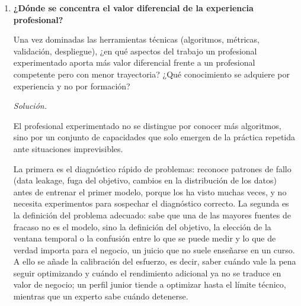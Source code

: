 \documentclass[12pt]{article}
\newcommand\sol[1]{\begin{mdframed}
\emph{Solución.} #1
\end{mdframed}}
\begin{document}
\begin{enumerate}
{\medskip
Las horas dieciocho a veintidós se reservan para la calibración y la evaluación final: calibrar las
probabilidades si se requiere precisión probabilística; evaluar en el conjunto de test con métricas
alineadas al problema (AUC-ROC, AUC-PR, F1 en el umbral operativo); y verificar la consistencia entre
particiones. Las dos últimas horas se dedican a documentar las decisiones, los resultados y las
limitaciones.

\medskip
Las decisiones clave se justifican por la restricción temporal y operativa: el orden secuencial
(variables antes que hiperparámetros) evita rehacer trabajo; programar la búsqueda bayesiana de forma
desatendida optimiza el ciclo de 24 horas reales; y la validación estratificada en 5 particiones
aporta la robustez necesaria para un dataset de 50.000 observaciones frente a un simple \textit{hold-out}.
}

\item \textbf{¿Dónde se concentra el valor diferencial de la experiencia profesional?}

Una vez dominadas las herramientas técnicas (algoritmos, métricas, validación, despliegue),
¿en qué aspectos del trabajo un profesional experimentado aporta más valor diferencial frente a un
profesional competente pero con menor trayectoria? ¿Qué conocimiento se adquiere por experiencia
y no por formación?

\sol{

El profesional experimentado no se distingue por conocer más algoritmos, sino por un conjunto de
capacidades que solo emergen de la práctica repetida ante situaciones imprevisibles.

\medskip
La primera es el diagnóstico rápido de problemas: reconoce patrones de fallo (data leakage, fuga del
objetivo, cambios en la distribución de los datos) antes de entrenar el primer modelo, porque los ha
visto muchas veces, y no necesita experimentos para sospechar el diagnóstico correcto. La segunda
es la definición del problema adecuado: sabe que una de las mayores fuentes de fracaso no es el
modelo, sino la definición del objetivo, la elección de la ventana temporal o la confusión entre lo
que se puede medir y lo que de verdad importa para el negocio, un juicio que no suele enseñarse en un
curso. A ello se añade la calibración del esfuerzo, es decir, saber cuándo vale la pena seguir
optimizando y cuándo el rendimiento adicional ya no se traduce en valor de negocio; un perfil junior
tiende a optimizar hasta el límite técnico, mientras que un experto sabe cuándo detenerse.

}
\end{enumerate}
\end{document}
